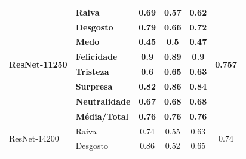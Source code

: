 \documentclass{beamer}
\begin{document}
\begin{frame}
\begin{table}[]
\begin{tabular}{llcccc}
\multirow{8}{*}{\textbf{ResNet-11250}} & \textbf{Raiva}        & \textbf{0.69}                         & \textbf{0.57}                          & \textbf{0.62}                         & \multirow{8}{*}{\textbf{0.757}}       \\
                                         & \textbf{Desgosto}     & \textbf{0.79}                         & \textbf{0.66}                          & \textbf{0.72}                         &                                       \\
                                         & \textbf{Medo}         & \textbf{0.45}                         & \textbf{0.5}                           & \textbf{0.47}                         &                                       \\
                                         & \textbf{Felicidade}   & \textbf{0.9}                          & \textbf{0.89}                          & \textbf{0.9}                          &                                       \\
                                         & \textbf{Tristeza}     & \textbf{0.6}                          & \textbf{0.65}                          & \textbf{0.63}                         &                                       \\
                                         & \textbf{Surpresa}     & \textbf{0.82}                         & \textbf{0.86}                          & \textbf{0.84}                         &                                       \\
                                         & \textbf{Neutralidade} & \textbf{0.67}                         & \textbf{0.68}                          & \textbf{0.68}                         &                                       \\
                                         & \textbf{Média/Total}  & \textbf{0.76}                         & \textbf{0.76}                          & \textbf{0.76}                         &                                       \\ \hline
\multirow{8}{*}{ResNet-14200}          & Raiva                 & 0.74                                  & 0.55                                   & 0.63                                  & \multirow{8}{*}{0.74}                 \\
                                         & Desgosto              & 0.86                                  & 0.52                                   & 0.65                                  &                                       \\

\end{tabular}
\end{table}
\end{frame}
\end{document}
